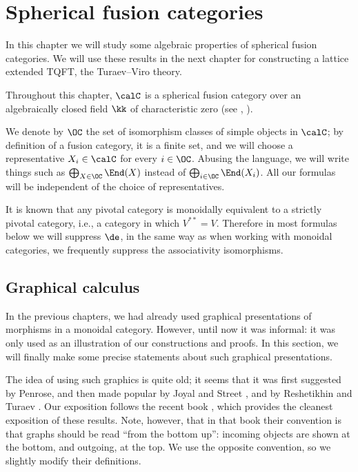 \chapter{Spherical fusion categories}\label{c:spherical}

In this chapter we will study some algebraic properties of spherical fusion
categories. We will use these results in the next chapter for constructing
a lattice extended TQFT, the Turaev--Viro theory.

Throughout this chapter, $\calC$ is a spherical fusion category over an
algebraically closed field $\kk$ of characteristic zero (see ,
).

We denote by $\OC$ the set of isomorphism classes of simple objects in $\calC$;
by definition of a fusion category, it is a finite set, and we will choose a
representative $X_i\in \calC$ for every $i\in \OC$. Abusing the language, we
will write things such as $\bigoplus_{X\in \OC} \End(X)$ instead of
$\bigoplus_{i\in \OC}\End(X_i)$. All our formulas will be independent of the
choice of representatives.

It is known that any pivotal category is monoidally equivalent to a strictly
pivotal category, i.e., a category in which $V^{**}=V$. Therefore in most
formulas below we will suppress $\de$, in the same way as when working with
monoidal categories, we frequently suppress the associativity isomorphisms.



\section{Graphical calculus}\label{s:graphical}
In the previous chapters, we had already used graphical presentations
of morphisms in a monoidal category. However, until now it was informal:
it was only used as an illustration of our constructions and proofs.
In this section, we will finally make some precise statements about such
graphical presentations.

The idea of using such graphics is quite old; it seems that it was first
suggested by Penrose, and then made popular by Joyal and Street
\cite{joyal-street}, \cite{joyal-street2} and by Reshetikhin and Turaev
\cite{reshetikhin-turaev}. Our exposition follows the recent book
\cite[Chapter 2]{turaev-virelizier}, which provides the cleanest exposition
of these results. Note, however, that in that book their convention is that
graphs should be read ``from the bottom up'': incoming objects are shown at the
bottom, and outgoing, at the top. We use the opposite convention, so we
slightly modify their definitions.

